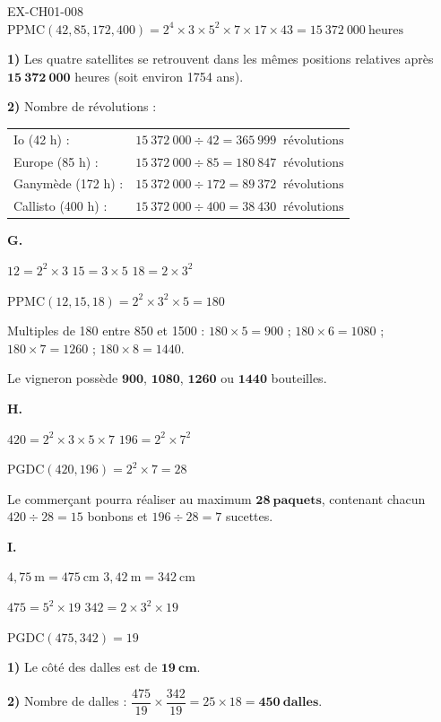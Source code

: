 \documentclass[12pt, a4paper]{article}
\begin{document}
\begin{solution}{EX-CH01-008}
$\text{PPMC}(42, 85, 172, 400) = 2^4 \times 3 \times 5^2 \times 7 \times 17 \times 43 = 15\ 372\ 000\ \text{heures}$

\textbf{1)} Les quatre satellites se retrouvent dans les mêmes positions relatives après $\mathbf{15\ 372\ 000}$ heures (soit environ 1754 ans).

\textbf{2)} Nombre de révolutions :

\begin{tabular}{ll}
Io (42 h) :       & $15\ 372\ 000 \div 42 = 365\ 999\ \text{ révolutions}$ \\[4pt]
Europe (85 h) :   & $15\ 372\ 000 \div 85 = 180\ 847\ \text{ révolutions}$ \\[4pt]
Ganymède (172 h) :& $15\ 372\ 000 \div 172 = 89\ 372\ \text{ révolutions}$ \\[4pt]
Callisto (400 h) :& $15\ 372\ 000 \div 400 = 38\ 430\ \text{ révolutions}$ \\[4pt]
\end{tabular}

\bigskip
\textbf{G.}

$12 = 2^2 \times 3$ \quad $15 = 3 \times 5$ \quad $18 = 2 \times 3^2$

$\text{PPMC}(12, 15, 18) = 2^2 \times 3^2 \times 5 = 180$

Multiples de 180 entre 850 et 1500 : $180 \times 5 = 900$ ; $180 \times 6 = 1080$ ; $180 \times 7 = 1260$ ; $180 \times 8 = 1440$.

Le vigneron possède $\mathbf{900}$, $\mathbf{1080}$, $\mathbf{1260}$ ou $\mathbf{1440}$ bouteilles.

\bigskip
\textbf{H.}

$420 = 2^2 \times 3 \times 5 \times 7$ \quad $196 = 2^2 \times 7^2$

$\text{PGDC}(420, 196) = 2^2 \times 7 = 28$

Le commerçant pourra réaliser au maximum $\mathbf{28\ paquets}$, contenant chacun $420 \div 28 = 15$ bonbons et $196 \div 28 = 7$ sucettes.

\bigskip
\textbf{I.}

$4{,}75\ \text{m} = 475\ \text{cm}$ \quad $3{,}42\ \text{m} = 342\ \text{cm}$

$475 = 5^2 \times 19$ \quad $342 = 2 \times 3^2 \times 19$

$\text{PGDC}(475, 342) = 19$

\textbf{1)} Le côté des dalles est de $\mathbf{19\ cm}$.

\textbf{2)} Nombre de dalles : $\dfrac{475}{19} \times \dfrac{342}{19} = 25 \times 18 = \mathbf{450\ dalles}$.


\end{solution}
\end{document}
